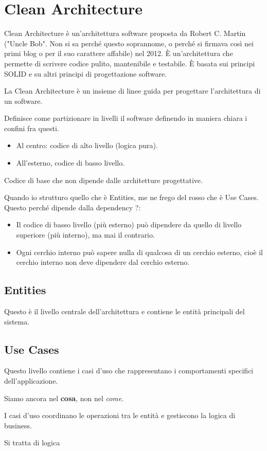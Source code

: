 \section{Clean Architecture}
\par Clean Architecture è un'architettura software proposta da Robert C. Martin ("Uncle Bob". Non si sa perché questo soprannome, o perché si firmava così nei primi blog o per il suo carattere affabile) nel 2012. È un'architettura che permette di scrivere codice pulito, mantenibile e testabile. È basata sui principi SOLID e su altri principi di progettazione software.
\par La Clean Architecture è un insieme di linee guida per progettare l'architettura di un software.
\par Definisce come partizionare in livelli il software definendo in maniera chiara i confini fra questi.
\begin{itemize}
    \item Al centro: codice di alto livello (logica pura).
    \item All'esterno, codice di basso livello. 
\end{itemize}
\par Codice di base che non dipende dalle architetture progettative.
\par Quando io strutturo quello che è Entities, me ne frego del rosso che è Use Cases. Questo perché dipende dalla dependency ?:
\begin{itemize}
    \item Il codice di basso livello (più esterno) può dipendere da quello di livello superiore (più interno), ma mai il contrario.
    \item Ogni cerchio interno può sapere nulla di qualcosa di un cerchio esterno, cioè il cerchio interno non deve dipendere dal cerchio esterno.
\end{itemize}

\subsection{Entities}
\par Questo è il livello centrale dell'architettura e contiene le entità principali del sistema.


\subsection{Use Cases}
\par Questo livello contiene i casi d'uso che rappresentano i comportamenti specifici dell'applicazione.
\par Siamo ancora nel \textbf{cosa}, non nel \textit{come}.
\par I casi d'uso coordinano le operazioni tra le entità e gestiscono la logica di business.
\par Si tratta di logica

